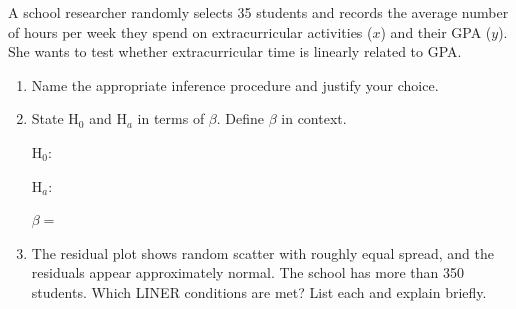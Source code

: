 \documentclass[10pt]{article}
\begin{document}
\namedateperiod

\vspace{0.1in}

A school researcher randomly selects 35 students and records the average number of
hours per week they spend on extracurricular activities ($x$) and their GPA ($y$).
She wants to test whether extracurricular time is linearly related to GPA.

\begin{enumerate}

  \item Name the appropriate inference procedure and justify your choice.


  \item State H$_0$ and H$_a$ in terms of $\beta$. Define $\beta$ in context.

        H$_0$: \blank{9cm}

        \vspace{0.05in}

        H$_a$: \blank{9cm}

        \vspace{0.05in}

        $\beta = $ \blank{8cm}

  \item The residual plot shows random scatter with roughly equal spread, and the
        residuals appear approximately normal. The school has more than 350 students.
        Which LINER conditions are met? List each and explain briefly.


\end{enumerate}
\end{document}
